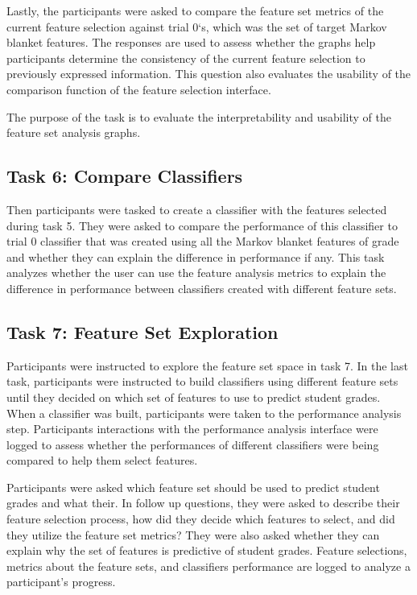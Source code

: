 Lastly, the participants were asked to compare the feature set metrics of the current feature selection against trial 0`s, which was the set of target Markov blanket features. The responses are used to assess whether the graphs help participants determine the consistency of the current feature selection to previously expressed information. This question also evaluates the usability of the comparison function of the feature selection interface. 

The purpose of the task is to evaluate the interpretability and usability of the feature set analysis graphs. 

\subsection { Task 6: Compare Classifiers }
Then participants were tasked to create a classifier with the features selected during task 5. They were asked to compare the performance of this classifier to trial 0 classifier that was created using all the Markov blanket features of grade and whether they can explain the difference in performance if any. This task analyzes whether the user can use the feature analysis metrics to explain the difference in performance between classifiers created with different feature sets.

\subsection { Task 7: Feature Set Exploration }
Participants were instructed to explore the feature set space in task 7. In the last task, participants were instructed to build classifiers using different feature sets until they decided on which set of features to use to predict student grades. When a classifier was built, participants were taken to the performance analysis step. Participants interactions with the performance analysis interface were logged to assess whether the performances of different classifiers were being compared to help them select features. 

Participants were asked which feature set should be used to predict student grades and what their. In follow up questions, they were asked to describe their feature selection process, how did they decide which features to select, and did they utilize the feature set metrics? They were also asked whether they can explain why the set of features is predictive of student grades. Feature selections, metrics about the feature sets, and classifiers performance are logged to analyze a participant's progress. 

